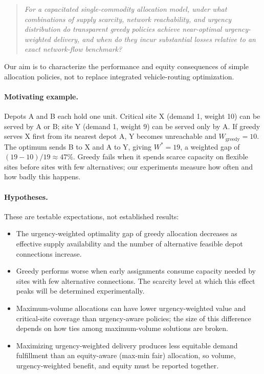 \documentclass[11pt]{article}
\begin{document}
\begin{quote}
\emph{For a capacitated single-commodity allocation model, under what
combinations of supply scarcity, network reachability, and urgency
distribution do transparent greedy policies achieve near-optimal
urgency-weighted delivery, and when do they incur substantial losses
relative to an exact network-flow benchmark?}
\end{quote}

\noindent Our aim is to characterize the performance and equity consequences
of simple allocation policies, not to replace integrated vehicle-routing
optimization.

\paragraph{Motivating example.}
Depots A and B each hold one unit. Critical site X (demand 1, weight 10)
can be served by A or B; site Y (demand 1, weight 9) can be served only by
A. If greedy serves X first from its nearest depot A, Y becomes unreachable
and $W_{\text{greedy}} = 10$. The optimum sends B to X and A to Y, giving
$W^* = 19$, a weighted gap of $(19-10)/19 \approx 47\%$. Greedy fails when
it spends scarce capacity on flexible sites before sites with few
alternatives; our experiments measure how often and how badly this happens.

\paragraph{Hypotheses.}
These are testable expectations, not established results:
\begin{itemize}
  \item[\textbf{H1}] The urgency-weighted optimality gap of greedy
        allocation decreases as effective supply availability and the number
        of alternative feasible depot connections increase.
  \item[\textbf{H2}] Greedy performs worse when early assignments consume
        capacity needed by sites with few alternative connections. The
        scarcity level at which this effect peaks will be determined
        experimentally.
  \item[\textbf{H3}] Maximum-volume allocations can have lower
        urgency-weighted value and critical-site coverage than
        urgency-aware policies; the size of this difference depends on how
        ties among maximum-volume solutions are broken.
  \item[\textbf{H4}] Maximizing urgency-weighted delivery produces less
        equitable demand fulfillment than an equity-aware (max-min fair)
        allocation, so volume, urgency-weighted benefit, and equity must be
        reported together.
\end{itemize}
\end{document}
